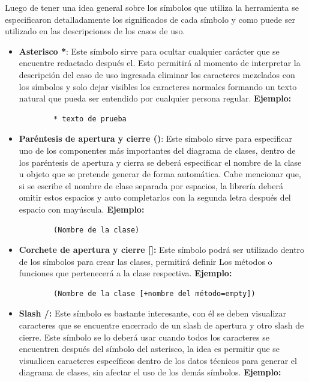Luego de tener una idea general sobre los símbolos que utiliza la herramienta se especificaron detalladamente los significados de cada símbolo y como puede ser utilizado en las descripciones de los casos de uso.  

\begin{itemize}
	\item \textbf{Asterisco *}: Este símbolo sirve para ocultar cualquier carácter que se encuentre redactado después el. Esto permitirá al momento de interpretar la descripción del caso de uso ingresada eliminar los caracteres mezclados con los símbolos y solo dejar visibles los caracteres normales formando un texto natural que pueda ser entendido por cualquier persona regular. \textbf{Ejemplo:}
	
	\begin{verbatim}
		* texto de prueba
	\end{verbatim}
	
	\item \textbf{Paréntesis de apertura y cierre ()}: Este símbolo sirve para especificar uno de los componentes más importantes del diagrama de clases, dentro de los paréntesis de apertura y cierra se deberá especificar el nombre de la clase u objeto que se pretende generar de forma automática. Cabe mencionar que, si se escribe el nombre de clase separada por espacios, la librería deberá omitir estos espacios y auto completarlos con la segunda letra después del espacio con mayúscula. \textbf{Ejemplo:}  
	
	\begin{verbatim}
		(Nombre de la clase)
	\end{verbatim}
	
	\item \textbf{Corchete de apertura y cierre []:} Este símbolo podrá ser utilizado dentro de los símbolos para crear las clases, permitirá definir Los métodos o funciones que pertenecerá a la clase respectiva. \textbf{Ejemplo:} 
	
	\begin{verbatim}
		(Nombre de la clase [+nombre del método=empty])
	\end{verbatim} 
	
	\item \textbf{Slash /:} Este símbolo es bastante interesante, con él se deben visualizar  caracteres que se encuentre encerrado de un slash de apertura y otro slash de cierre. Este símbolo se lo deberá usar cuando todos los caracteres se encuentren después del símbolo del asterisco, la idea es permitir que se visualicen caracteres específicos dentro de los datos técnicos para generar el diagrama de clases, sin afectar el uso de los demás símbolos. \textbf{Ejemplo:}
	

\end{itemize}
